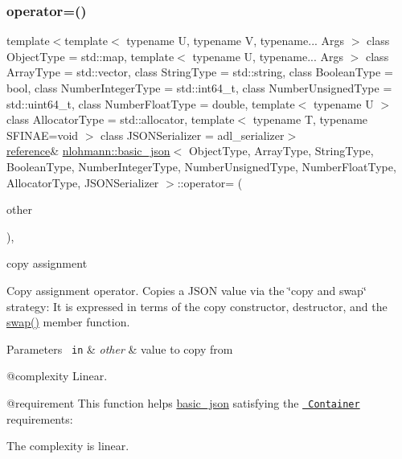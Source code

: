 \subsubsection{\texorpdfstring{operator=()}{operator=()}}
{\footnotesize\ttfamily template$<$template$<$ typename U, typename V, typename... Args $>$ class Object\+Type = std\+::map, template$<$ typename U, typename... Args $>$ class Array\+Type = std\+::vector, class String\+Type  = std\+::string, class Boolean\+Type  = bool, class Number\+Integer\+Type  = std\+::int64\+\_\+t, class Number\+Unsigned\+Type  = std\+::uint64\+\_\+t, class Number\+Float\+Type  = double, template$<$ typename U $>$ class Allocator\+Type = std\+::allocator, template$<$ typename T, typename S\+F\+I\+N\+A\+E=void $>$ class J\+S\+O\+N\+Serializer = adl\+\_\+serializer$>$ \\
\mbox{\hyperlink{classnlohmann_1_1basic__json_ac6a5eddd156c776ac75ff54cfe54a5bc}{reference}}\& \mbox{\hyperlink{classnlohmann_1_1basic__json}{nlohmann\+::basic\+\_\+json}}$<$ Object\+Type, Array\+Type, String\+Type, Boolean\+Type, Number\+Integer\+Type, Number\+Unsigned\+Type, Number\+Float\+Type, Allocator\+Type, J\+S\+O\+N\+Serializer $>$\+::operator= (\begin{DoxyParamCaption}\item[{\mbox{\hyperlink{classnlohmann_1_1basic__json}{basic\+\_\+json}}$<$ Object\+Type, Array\+Type, String\+Type, Boolean\+Type, Number\+Integer\+Type, Number\+Unsigned\+Type, Number\+Float\+Type, Allocator\+Type, J\+S\+O\+N\+Serializer $>$}]{other }\end{DoxyParamCaption})\hspace{0.3cm}{\ttfamily [inline]}, {\ttfamily [noexcept]}}



copy assignment 

Copy assignment operator. Copies a J\+S\+ON value via the \char`\"{}copy and swap\char`\"{} strategy\+: It is expressed in terms of the copy constructor, destructor, and the \mbox{\hyperlink{classnlohmann_1_1basic__json_a8c9d932353e1ab98a7dc2fc27e002031}{swap()}} member function.


\begin{DoxyParams}[1]{Parameters}
\mbox{\texttt{ in}}  & {\em other} & value to copy from\\
\hline
\end{DoxyParams}
@complexity Linear.

@requirement This function helps {\ttfamily \mbox{\hyperlink{classnlohmann_1_1basic__json}{basic\+\_\+json}}} satisfying the \href{http://en.cppreference.com/w/cpp/concept/Container}{\texttt{ Container}} requirements\+:
\begin{DoxyItemize}
\item The complexity is linear.
\end{DoxyItemize}

